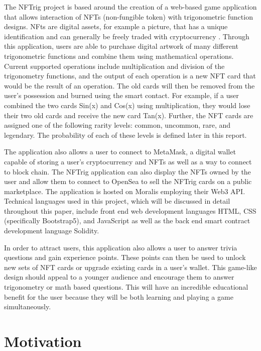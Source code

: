 \documentclass[acmsmall,nonacm]{acmart}
\begin{document}
The NFTrig project is based around the creation of a web-based game application that allows interaction of NFTs (non-fungible token) with trigonometric function designs. NFts are digital assets, for example a picture, that has a  unique identification and can generally be freely traded with cryptocurrency \cite{wang2021non}.  Through this application, users are able to purchase digital artwork of many different trigonometric functions and combine them using mathematical operations. Current supported operations include multiplication and division of the trigonometry functions, and the output of each operation is a new NFT card that would be the result of an operation. The old cards will then be removed from the user's possession and burned using the smart contact. For example, if a user combined the two cards Sin(x) and Cos(x) using multiplication, they would lose their two old cards and receive the new card Tan(x). Further, the NFT cards are assigned one of the following rarity levels: common, uncommon, rare, and legendary. The probability of each of these levels is defined later in this report.

The application also allows a user to connect to MetaMask, a digital wallet capable of storing a user's cryptocurrency and NFTs as well as a way to connect to block chain. The NFTrig application can also display the NFTs owned by the user and allow them to connect to OpenSea to sell the NFTrig cards on a public marketplace. The application is hosted on Moralis employing their Web3 API. Technical languages used in this project, which will be discussed in detail throughout this paper, include front end web development languages HTML, CSS (specifically Bootstrap5), and JavaScript as well as the back end smart contract development language Solidity.

In order to attract users, this application also allows a user to answer trivia questions and gain experience points. These points can then be used to unlock new sets of NFT cards or upgrade existing cards in a user's wallet. This game-like design should appeal to a younger audience and encourage them to answer trigonometry or math based questions. This will have an incredible educational benefit for the user because they will be both learning and playing a game simultaneously.

\section{Motivation}
\end{document}
